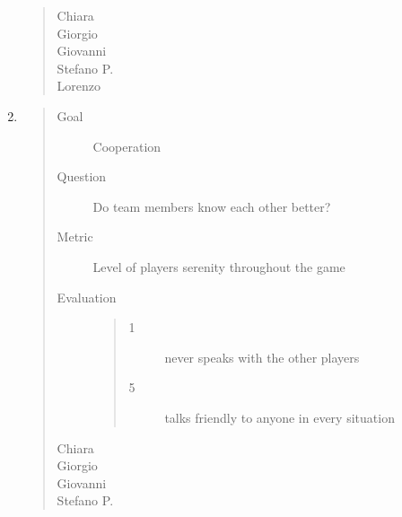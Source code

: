 \documentclass[letterpaper,10pt,italian]{sphinxmanual}
\begin{document}
\begin{enumerate}
\begin{quote}
\begin{description}
\item[{Chiara}] \leavevmode
{}

\item[{Giorgio}] \leavevmode
{}

\item[{Giovanni}] \leavevmode
{}

\item[{Stefano P.}] \leavevmode
{}

\item[{Lorenzo}] \leavevmode
{}

\end{description}\end{quote}

\item {} \begin{quote}\begin{description}
\item[{Goal}] \leavevmode
\sphinxAtStartPar
Cooperation

\item[{Question}] \leavevmode
\sphinxAtStartPar
Do team members know each other better?

\item[{Metric}] \leavevmode
\sphinxAtStartPar
Level of players\textquotesingle{} serenity throughout the game

\item[{Evaluation}] \leavevmode\begin{quote}\begin{description}
\item[{1}] \leavevmode
\sphinxAtStartPar
never speaks with the other players

\item[{5}] \leavevmode
\sphinxAtStartPar
talks friendly to anyone in every situation

\end{description}\end{quote}

\item[{Chiara}] \leavevmode
{}

\item[{Giorgio}] \leavevmode
{}

\item[{Giovanni}] \leavevmode
{}

\item[{Stefano P.}] \leavevmode
{}


\end{description}
\end{quote}
\end{enumerate}
\end{document}
